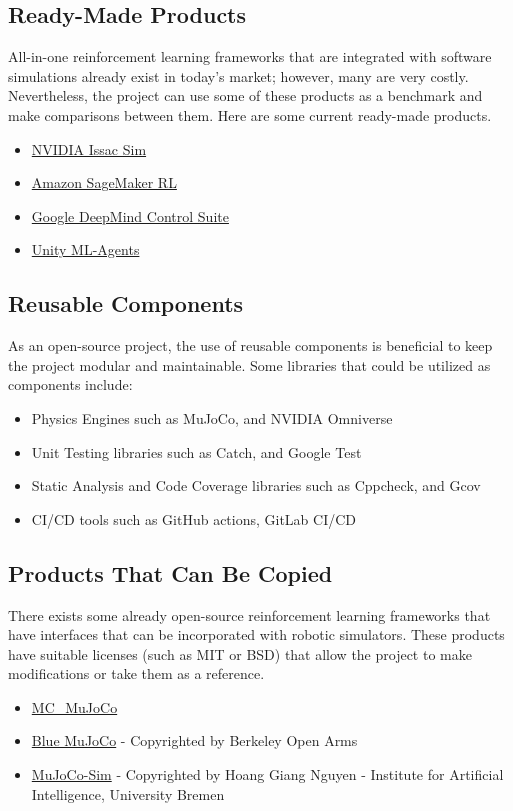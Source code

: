 \documentclass[12pt]{article}
\newcommand{\lips}{\textit{Insert your content here.}}
\begin{document}
\subsection{Ready-Made Products}

All-in-one reinforcement learning frameworks that are integrated with software simulations already exist in today’s market; however, many are very costly. Nevertheless, the project can use some of these products as a benchmark and make comparisons between them. Here are some current ready-made products.
\begin{itemize}
  \item \href{https://developer.nvidia.com/isaac/sim}{NVIDIA Issac Sim}
  \item \href{https://aws.amazon.com/sagemaker/}{Amazon SageMaker RL}
  \item \href{https://github.com/google-deepmind/dm_control?tab=readme-ov-file}{Google DeepMind Control Suite}
  \item \href{https://github.com/Unity-Technologies/ml-agents}{Unity ML-Agents}
\end{itemize}

\subsection{Reusable Components}
As an open-source project, the use of reusable components is beneficial to keep the project modular and maintainable. Some libraries that could be utilized as components include:
\begin{itemize}
  \item Physics Engines such as MuJoCo, and NVIDIA Omniverse
  \item Unit Testing libraries such as Catch, and Google Test
  \item Static Analysis and Code Coverage libraries such as Cppcheck, and Gcov
  \item CI/CD tools such as GitHub actions, GitLab CI/CD
\end{itemize}

\subsection{Products That Can Be Copied}
There exists some already open-source reinforcement learning frameworks that have interfaces that can be incorporated with robotic simulators. These products have suitable licenses (such as MIT or BSD) that allow the project to make modifications or take them as a reference.
\begin{itemize}
  \item \href{https://github.com/rohanpsingh/mc\_mujoco}{MC\_MuJoCo}
  \item \href{https://github.com/berkeleyopenarms/blue_mujoco_v1?tab=readme-ov-file}{Blue MuJoCo} - Copyrighted by Berkeley Open Arms
  \item \href{https://github.com/HoangGiang93/mujoco_sim?tab=readme-ov-file}{MuJoCo-Sim} - Copyrighted by Hoang Giang Nguyen - Institute for Artificial Intelligence, University Bremen
\end{itemize}
\end{document}
